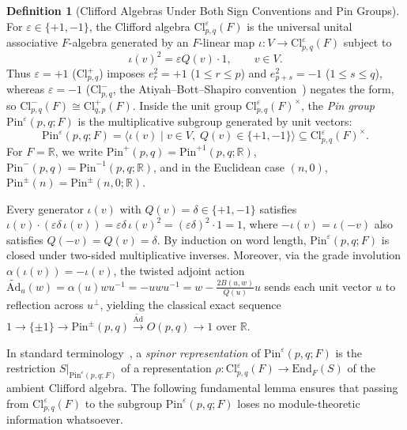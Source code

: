 \documentclass[11pt,a4paper]{article}
\theoremstyle{plain}
\theoremstyle{definition}
\newtheorem{definition}[theorem]{Definition}
\newcommand{\Cl}{\mathrm{Cl}}
\newcommand{\Pin}{\mathrm{Pin}}
\newcommand{\End}{\mathrm{End}}
\newcommand{\Ad}{\widetilde{\mathrm{Ad}}}
\newcommand{\R}{\mathbb{R}}
\begin{document}
\begin{definition}[Clifford Algebras Under Both Sign Conventions and Pin Groups]
\label{def:cliff-pin}
For $\varepsilon \in \{+1, -1\}$, the Clifford algebra $\Cl_{p,q}^\varepsilon(F)$ is the universal unital associative $F$-algebra generated by an $F$-linear map $\iota : V \to \Cl_{p,q}^\varepsilon(F)$ subject to
\begin{equation}\label{eq:cliff-rel}
  \iota(v)^2 = \varepsilon Q(v)\cdot 1, \qquad v \in V.
\end{equation}
Thus $\varepsilon = +1$ ($\Cl_{p,q}^+$) imposes $e_r^2 = +1$ ($1 \le r \le p$) and $e_{p+s}^2 = -1$ ($1 \le s \le q$), whereas $\varepsilon = -1$ ($\Cl_{p,q}^-$, the Atiyah--Bott--Shapiro convention~\cite{ABS64}) negates the form, so $\Cl_{p,q}^-(F) \cong \Cl_{q,p}^+(F)$. Inside the unit group $\Cl_{p,q}^\varepsilon(F)^\times$, the \emph{Pin group} $\Pin^\varepsilon(p,q; F)$ is the multiplicative subgroup generated by unit vectors:
\[
  \Pin^\varepsilon(p,q; F) = \bigl\langle \iota(v) \;\big|\; v \in V,\; Q(v) \in \{+1, -1\} \bigr\rangle \subseteq \Cl_{p,q}^\varepsilon(F)^\times.
\]
For $F = \R$, we write $\Pin^+(p,q) = \Pin^{+1}(p,q;\R)$, $\Pin^-(p,q) = \Pin^{-1}(p,q;\R)$, and in the Euclidean case $(n,0)$, $\Pin^\pm(n) = \Pin^\pm(n,0;\R)$.
\end{definition}

Every generator $\iota(v)$ with $Q(v) = \delta \in \{+1, -1\}$ satisfies $\iota(v) \cdot (\varepsilon \delta\, \iota(v)) = \varepsilon \delta \, \iota(v)^2 = (\varepsilon \delta)^2 \cdot 1 = 1$, where $-\iota(v) = \iota(-v)$ also satisfies $Q(-v) = Q(v) = \delta$. By induction on word length, $\Pin^\varepsilon(p,q; F)$ is closed under two-sided multiplicative inverses. Moreover, via the grade involution $\alpha(\iota(v)) = -\iota(v)$, the twisted adjoint action $\Ad_u(w) = \alpha(u) w u^{-1} = -u w u^{-1} = w - \frac{2 B(u,w)}{Q(u)} u$ sends each unit vector $u$ to reflection across $u^\perp$, yielding the classical exact sequence $1 \to \{\pm 1\} \to \Pin^\pm(p,q) \xrightarrow{\Ad} O(p,q) \to 1$ over $\R$.

In standard terminology~\cite{ABS64,LM89}, a \emph{spinor representation} of $\Pin^\varepsilon(p,q; F)$ is the restriction $S|_{\Pin^\varepsilon(p,q; F)}$ of a representation $\rho : \Cl_{p,q}^\varepsilon(F) \to \End_F(S)$ of the ambient Clifford algebra. The following fundamental lemma ensures that passing from $\Cl_{p,q}^\varepsilon(F)$ to the subgroup $\Pin^\varepsilon(p,q; F)$ loses no module-theoretic information whatsoever.
\end{document}
